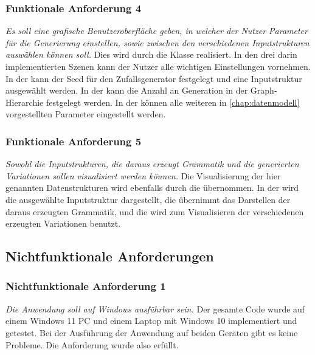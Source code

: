 \subsubsection{Funktionale Anforderung 4}
\textit{Es soll eine grafische Benutzeroberfläche geben, in welcher der Nutzer Parameter für die Generierung einstellen, sowie zwischen
den verschiedenen Inputstrukturen auswählen können soll.} Dies wird durch die Klasse  realisiert. In den drei darin
implementierten Szenen kann der Nutzer alle wichtigen Einstellungen vornehmen. In der  kann der Seed für den Zufallsgenerator festgelegt
und eine Inputstruktur ausgewählt werden. In der  kann die Anzahl an Generation in der Graph-Hierarchie festgelegt werden. In der
 können alle weiteren in \autoref{chap:datenmodell} vorgestellten Parameter eingestellt werden.

\subsubsection{Funktionale Anforderung 5}
\textit{Sowohl die Inputstrukturen, die daraus erzeugt Grammatik und die generierten Variationen sollen visualisiert werden können.} Die Visualisierung
der hier genannten Datenstrukturen wird ebenfalls durch die  übernommen. In der  wird die ausgewählte
Inputstruktur dargestellt, die  übernimmt das Darstellen der daraus erzeugten Grammatik, und die  wird zum
Visualisieren der verschiedenen erzeugten Variationen benutzt.

\subsection{Nichtfunktionale Anforderungen}
\subsubsection{Nichtfunktionale Anforderung 1}
\textit{Die Anwendung soll auf Windows ausführbar sein.} Der gesamte Code wurde auf einem Windows 11 PC und einem Laptop mit Windows 10 implementiert
und getestet. Bei der Ausführung der Anwendung auf beiden Geräten gibt es keine Probleme. Die Anforderung wurde also erfüllt.

